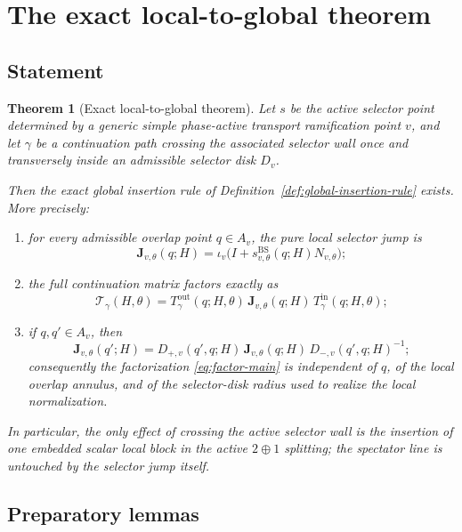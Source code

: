 \documentclass[11pt]{article}
\numberwithin{equation}{section}
\newtheorem{theorem}{Theorem}[section]
\theoremstyle{definition}
\newcommand{\Jemb}{\mathbf J_{v,\theta}}
\newcommand{\Tin}{T^{\mathrm{in}}_{\gamma}}
\newcommand{\Tout}{T^{\mathrm{out}}_{\gamma}}
\newcommand{\Tfun}{\mathcal T}
\begin{document}
\section{The exact local-to-global theorem}

\subsection{Statement}

\begin{theorem}[Exact local-to-global theorem]
\label{thm:local-to-global}
Let $s$ be the active selector point determined by a generic simple phase-active transport ramification point $v$, and let $\gamma$ be a continuation path crossing the associated selector wall once and transversely inside an admissible selector disk $D_v$.

Then the exact global insertion rule of Definition~\ref{def:global-insertion-rule} exists. More precisely:
\begin{enumerate}
  \item for every admissible overlap point $q\in A_v$, the pure local selector jump is
  \begin{equation}
  \label{eq:Jemb-main}
  \Jemb(q;H)=\iota_v\!\bigl(I+s^{\mathrm{BS}}_{v,\theta}(q;H)N_{v,\theta}\bigr);
  \end{equation}
  \item the full continuation matrix factors exactly as
  \begin{equation}
  \label{eq:factor-main}
  \Tfun_\gamma(H,\theta)=\Tout(q;H,\theta)\,\Jemb(q;H)\,\Tin(q;H,\theta);
  \end{equation}
  \item if $q,q'\in A_v$, then
  \begin{equation}
  \label{eq:J-transport-law}
  \Jemb(q';H)=D_{+,v}(q',q;H)\,\Jemb(q;H)\,D_{-,v}(q',q;H)^{-1};
  \end{equation}
  consequently the factorization \eqref{eq:factor-main} is independent of $q$, of the local overlap annulus, and of the selector-disk radius used to realize the local normalization.
\end{enumerate}
In particular, the only effect of crossing the active selector wall is the insertion of one embedded scalar local block in the active $2\oplus 1$ splitting; the spectator line is untouched by the selector jump itself.
\end{theorem}

\subsection{Preparatory lemmas}
\end{document}
